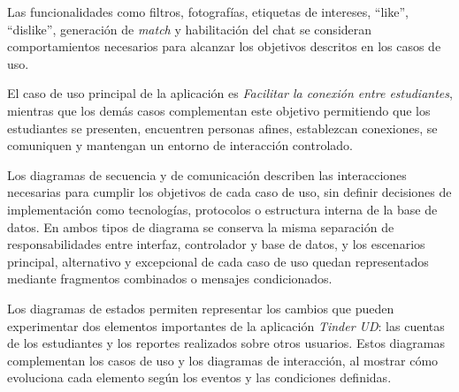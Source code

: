 \documentclass[11pt,a4paper]{article}
\begin{document}
Las funcionalidades como filtros, fotografías, etiquetas de intereses, ``like'',
``dislike'', generación de \textit{match} y habilitación del chat se consideran
comportamientos necesarios para alcanzar los objetivos descritos en los casos de
uso.

El caso de uso principal de la aplicación es \textit{Facilitar la conexión entre
estudiantes}, mientras que los demás casos complementan este objetivo permitiendo
que los estudiantes se presenten, encuentren personas afines, establezcan
conexiones, se comuniquen y mantengan un entorno de interacción controlado.

Los diagramas de secuencia y de comunicación describen las interacciones
necesarias para cumplir los objetivos de cada caso de uso, sin definir decisiones
de implementación como tecnologías, protocolos o estructura interna de la base de
datos. En ambos tipos de diagrama se conserva la misma separación de
responsabilidades entre interfaz, controlador y base de datos, y los escenarios
principal, alternativo y excepcional de cada caso de uso quedan representados
mediante fragmentos combinados o mensajes condicionados.

Los diagramas de estados permiten representar los cambios que pueden
experimentar dos elementos importantes de la aplicación \textit{Tinder UD}: las
cuentas de los estudiantes y los reportes realizados sobre otros usuarios. Estos
diagramas complementan los casos de uso y los diagramas de interacción, al
mostrar cómo evoluciona cada elemento según los eventos y las condiciones
definidas.
\end{document}
